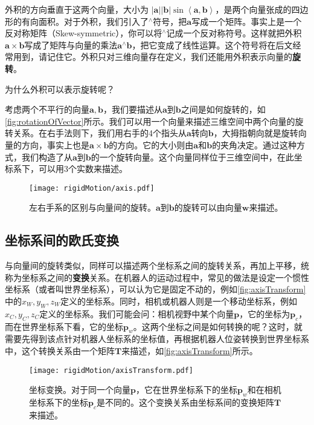 外积的方向垂直于这两个向量，大小为 $\left| \bm{a} \right|\left| \bm{b} \right|\sin \left\langle {\bm{a},\bm{b}} \right\rangle $，是两个向量张成的四边形的有向面积。对于外积，我们引入了$^ \wedge$符号，把$\bm{a}$写成一个矩阵。事实上是一个反对称矩阵（Skew-symmetric），你可以将$^ \wedge$记成一个反对称符号。这样就把外积$\bm{a} \times \bm{b}$写成了矩阵与向量的乘法${ \bm{a}^ \wedge } \bm{b}$，把它变成了线性运算。这个符号将在后文经常用到，请记住它。外积只对三维向量存在定义，我们还能用外积表示向量的\textbf{旋转}。

为什么外积可以表示旋转呢？

考虑两个不平行的向量$\bm{a}, \bm{b}$，我们要描述从$\bm{a}$到$\bm{b}$之间是如何旋转的，如\autoref{fig:rotationOfVector}所示。我们可以用一个向量来描述三维空间中两个向量的旋转关系。在右手法则下，我们用右手的4个指头从$\bm{a}$转向$\bm{b}$，大拇指朝向就是旋转向量的方向，事实上也是$\bm{a} \times \bm{b}$的方向。它的大小则由$\bm{a}$和$\bm{b}$的夹角决定。通过这种方式，我们构造了从$\bm{a}$到$\bm{b}$的一个旋转向量。这个向量同样位于三维空间中，在此坐标系下，可以用3个实数来描述。

\begin{figure}[!htp]
	\centering
	\texttt{[image: rigidMotion/axis.pdf]}
	\caption{左右手系的区别与向量间的旋转。$\bm{a}$到$\bm{b}$的旋转可以由向量$\bm{w}$来描述。}
	\label{fig:rotationOfVector}
\end{figure}

\subsection{坐标系间的欧氏变换}
与向量间的旋转类似，同样可以描述两个坐标系之间的旋转关系，再加上平移，统称为坐标系之间的\textbf{变换}关系。在机器人的运动过程中，常见的做法是设定一个惯性坐标系（或者叫世界坐标系），可以认为它是固定不动的，例如\autoref{fig:axisTransform}中的$x_W, y_W, z_W$定义的坐标系。同时，相机或机器人则是一个移动坐标系，例如$x_C, y_C, z_C$定义的坐标系。我们可能会问：相机视野中某个向量$\bm{p}$，它的坐标为$\bm{p}_c$，而在世界坐标系下看，它的坐标$\bm{p}_w$。这两个坐标之间是如何转换的呢？这时，就需要先得到该点针对机器人坐标系的坐标值，再根据机器人位姿转换到世界坐标系中，这个转换关系由一个矩阵$\bm{T}$来描述，如\autoref{fig:axisTransform}所示。

\begin{figure}[!htp]
	\centering
	\texttt{[image: rigidMotion/axisTransform.pdf]}
	\caption{坐标变换。对于同一个向量$\bm{p}$，它在世界坐标系下的坐标$\bm{p}_w$和在相机坐标系下的坐标$\bm{p}_c$是不同的。这个变换关系由坐标系间的变换矩阵$\bm{T}$来描述。}
	\label{fig:axisTransform}
\end{figure}

